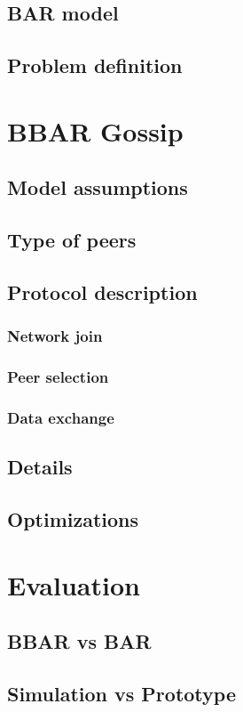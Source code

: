 \documentclass[mscthesis]{usiinfthesis}
\begin{document}
\section{BAR model}

\section{Problem definition}

\chapter{BBAR Gossip}
\section{Model assumptions}
\section{Type of peers}
\section{Protocol description}
\subsection{Network join}
\subsection{Peer selection}
\subsection{Data exchange}
\section{Details}
\section{Optimizations}

\chapter{Evaluation}
\section{BBAR vs BAR}
\section{Simulation vs Prototype}
\end{document}
